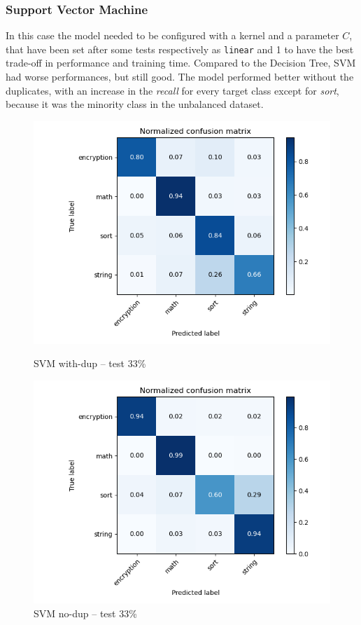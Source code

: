 \documentclass[11pt]{article}
\begin{document}
	\subsubsection{Support Vector Machine}
	In this case the model needed to be configured with a kernel and a parameter
	$C$, that have been set after some tests respectively as \texttt{linear} and
	1 to have the best trade-off in performance and training time.
	Compared to the Decision Tree, SVM had worse performances, but still good.
	The model performed better without the duplicates, with an increase in the
	\textit{recall} for every target class except for \textit{sort}, because it was the
	minority class in the unbalanced dataset.
	\begin{figure}[H]
		\centering
		\begin{minipage}{.5\textwidth}
		  \centering
		  \includegraphics[width=\linewidth]{assets/svc_dup_0.333.png}
		  \caption{SVM with-dup -- test 33\%}
		\end{minipage}%
		\begin{minipage}{.5\textwidth}
		  \centering
		  \includegraphics[width=\linewidth]{assets/svc_nodup_0.333.png}
		  \caption{SVM no-dup -- test 33\%}
		\end{minipage}
	\end{figure}
\end{document}
